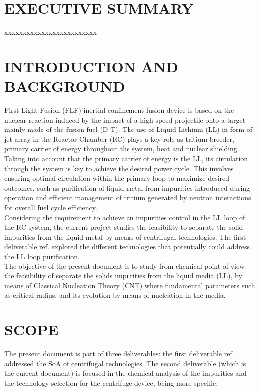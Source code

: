 \section{EXECUTIVE SUMMARY} 
xxxxxxxxxxxxxxxxxxxxxxxxx

\newpage
\section{INTRODUCTION AND BACKGROUND} 

First Light Fusion (FLF) inertial confinement fusion device is based on the nuclear reaction induced by the impact of a high-speed projectile onto a target mainly made of the fusion fuel (D-T). The use of Liquid Lithium (LL) in form of jet array in the Reactor Chamber (RC) plays a key role as tritium breeder, primary carrier of energy throughout the system, heat and nuclear shielding. \\

\noindent Taking into account that the primary carrier of energy is the LL, its circulation through the system is key to achieve the desired power cycle. This involves ensuring optimal circulation within the primary loop to maximize desired outcomes, such as purification of liquid metal from impurities introduced during operation and efficient management of tritium generated by neutron interactions for overall fuel cycle efficiency.\\

\noindent Considering the requirement to achieve an impurities control in the LL loop of the RC system, the current project studies the feasibility to separate the solid impurities from the liquid metal by means of centrifugal technologies. The first deliverable ref. \cite{SoA} explored the different technologies that potentially could address the LL loop purification.\\

\noindent The objective of the present document is to study from chemical point of view the feasibility of separate the solids impurities from the liquid media (LL), by means of Classical Nucleation Theory (CNT) where fundamental parameters such as critical radius, and its evolution by means of nucleation in the media.

\newpage
\section{SCOPE}\label{sec:scope}
The present document is part of three deliverables: the first deliverable ref. \cite{SoA} addressed the SoA of centrifugal technologies. The second deliverable (which is the current document) is focused in the chemical analysis of the impurities and the technology selection for the centrifuge device, being more specific:

